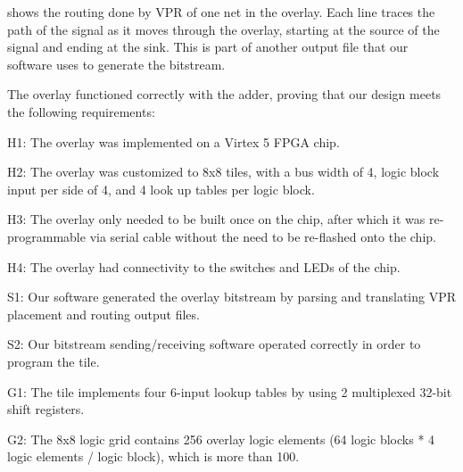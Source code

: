  shows the routing done by VPR of one net in the overlay.
Each line traces the path of the signal as it moves through the overlay, starting at the source of the signal and ending at the sink.
This is part of another output file that our software uses to generate the bitstream.

The overlay functioned correctly with the adder, proving that our design meets the following requirements:
\begin{itemlist}
	\item H1: The overlay was implemented on a Virtex 5 FPGA chip.
	\item H2: The overlay was customized to 8x8 tiles, with a bus width of 4, logic block input per side of 4, and 4 look up tables per logic block.
	\item H3: The overlay only needed to be built once on the chip, after which it was re-programmable via serial cable without the need to be re-flashed onto the chip.
	\item H4: The overlay had connectivity to the switches and LEDs of the chip.
	\item S1: Our software generated the overlay bitstream by parsing and translating VPR placement and routing output files.
	\item S2: Our bitstream sending/receiving software operated correctly in order to program the tile.
	\item G1: The tile implements four 6-input lookup tables by using 2 multiplexed 32-bit shift registers.
	\item G2: The 8x8 logic grid contains 256 overlay logic elements (64 logic blocks * 4 logic elements / logic block), which is more than 100.
\end{itemlist}




